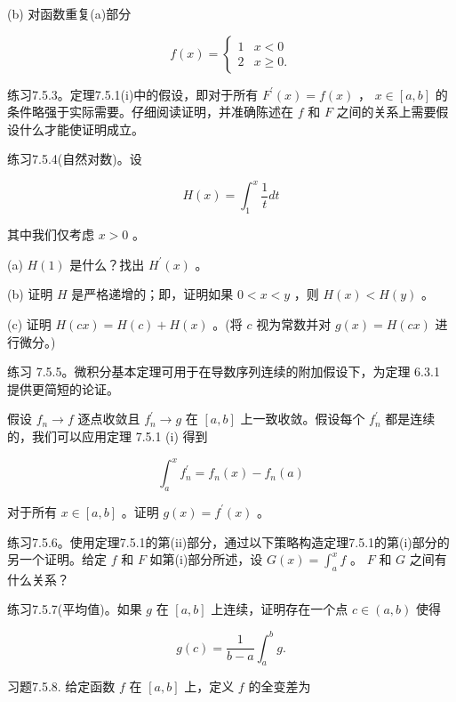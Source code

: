 (b) 对函数重复(a)部分

\[
f\left( x\right)  = \left\{  \begin{array}{ll} 1 & x < 0 \\  2 & x \geq  0. \end{array}\right.
\]

练习7.5.3。定理7.5.1(i)中的假设，即对于所有 \({F}^{\prime }\left( x\right)  = f\left( x\right)\) ， \(x \in  \left\lbrack  {a,b}\right\rbrack\) 的条件略强于实际需要。仔细阅读证明，并准确陈述在 \(f\) 和 \(F\) 之间的关系上需要假设什么才能使证明成立。

练习7.5.4(自然对数)。设

\[
H\left( x\right)  = {\int }_{1}^{x}\frac{1}{t}{dt}
\]

其中我们仅考虑 \(x > 0\) 。

(a) \(H\left( 1\right)\) 是什么？找出 \({H}^{\prime }\left( x\right)\) 。

(b) 证明 \(H\) 是严格递增的；即，证明如果 \(0 < x < y\) ，则 \(H\left( x\right)  < H\left( y\right)\) 。

(c) 证明 \(H\left( {cx}\right)  = H\left( c\right)  + H\left( x\right)\) 。(将 \(c\) 视为常数并对 \(g\left( x\right)  = H\left( {cx}\right)\) 进行微分。)

练习 7.5.5。微积分基本定理可用于在导数序列连续的附加假设下，为定理 6.3.1 提供更简短的论证。

假设 \({f}_{n} \rightarrow  f\) 逐点收敛且 \({f}_{n}^{\prime } \rightarrow  g\) 在 \(\left\lbrack  {a,b}\right\rbrack\) 上一致收敛。假设每个 \({f}_{n}^{\prime }\) 都是连续的，我们可以应用定理 7.5.1 (i) 得到

\[
{\int }_{a}^{x}{f}_{n}^{\prime } = {f}_{n}\left( x\right)  - {f}_{n}\left( a\right)
\]

对于所有 \(x \in  \left\lbrack  {a,b}\right\rbrack\) 。证明 \(g\left( x\right)  = {f}^{\prime }\left( x\right)\) 。

练习7.5.6。使用定理7.5.1的第(ii)部分，通过以下策略构造定理7.5.1的第(i)部分的另一个证明。给定 \(f\) 和 \(F\) 如第(i)部分所述，设 \(G\left( x\right)  = {\int }_{a}^{x}f\) 。 \(F\) 和 \(G\) 之间有什么关系？

练习7.5.7(平均值)。如果 \(g\) 在 \(\left\lbrack  {a,b}\right\rbrack\) 上连续，证明存在一个点 \(c \in  \left( {a,b}\right)\) 使得

\[
g\left( c\right)  = \frac{1}{b - a}{\int }_{a}^{b}g.
\]

习题7.5.8. 给定函数 \(f\) 在 \(\left\lbrack  {a,b}\right\rbrack\) 上，定义 \(f\) 的全变差为


